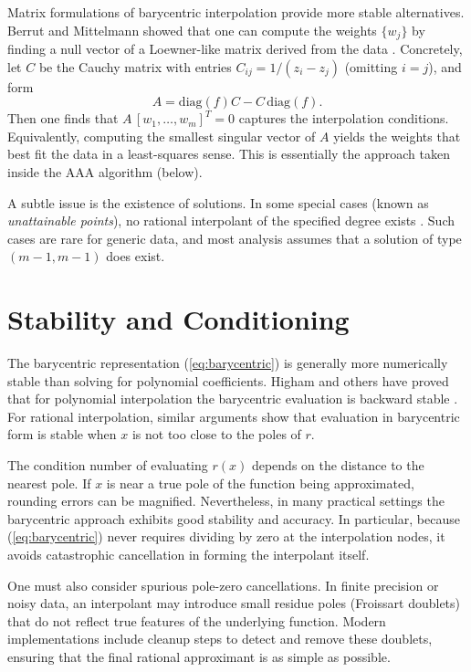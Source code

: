 \documentclass{article}
\begin{document}
Matrix formulations of barycentric interpolation provide more stable alternatives.  Berrut and Mittelmann showed that one can compute the weights $\{w_j\}$ by finding a null vector of a Loewner-like matrix derived from the data \cite{BerrutMittelmann1997}.  Concretely, let $C$ be the Cauchy matrix with entries $C_{ij} = 1/(z_i - z_j)$ (omitting $i=j$), and form
\[
A = \text{diag}(f)C - C\,\text{diag}(f).
\]
Then one finds that $A\,[w_1,\dots,w_m]^T = 0$ captures the interpolation conditions.  Equivalently, computing the smallest singular vector of $A$ yields the weights that best fit the data in a least-squares sense.  This is essentially the approach taken inside the AAA algorithm (below).

A subtle issue is the existence of solutions.  In some special cases (known as \emph{unattainable points}), no rational interpolant of the specified degree exists \cite{SchneiderWerner1986}.  Such cases are rare for generic data, and most analysis assumes that a solution of type $(m-1,m-1)$ does exist.

\section{Stability and Conditioning}
The barycentric representation (\ref{eq:barycentric}) is generally more numerically stable than solving for polynomial coefficients.  Higham and others have proved that for polynomial interpolation the barycentric evaluation is backward stable \cite{BerrutBaltenspergerMittelmann2005}.  For rational interpolation, similar arguments show that evaluation in barycentric form is stable when $x$ is not too close to the poles of $r$.

The condition number of evaluating $r(x)$ depends on the distance to the nearest pole.  If $x$ is near a true pole of the function being approximated, rounding errors can be magnified.  Nevertheless, in many practical settings the barycentric approach exhibits good stability and accuracy.  In particular, because (\ref{eq:barycentric}) never requires dividing by zero at the interpolation nodes, it avoids catastrophic cancellation in forming the interpolant itself.

One must also consider spurious pole-zero cancellations.  In finite precision or noisy data, an interpolant may introduce small residue poles (Froissart doublets) that do not reflect true features of the underlying function.  Modern implementations include cleanup steps to detect and remove these doublets, ensuring that the final rational approximant is as simple as possible.
\end{document}
